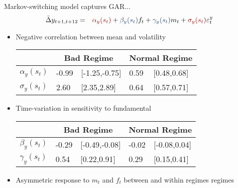 \documentclass[xcolor=dvipsnames, xcolor=table, 10pt]{beamer}
\newcommand{\pb}[1]{{\color{fedblue}#1}}
\newcommand{\rr}[1]{{\color{darkred}#1}}
\newcommand*{\h}{\hspace{0.15cm}}
\begin{document}
\begin{frame}{Markov-switching model captures GAR...}
\vspace*{-0.25in}
\begin{eqnarray*}
\bar{\Delta} {y}_{t+1,t+12} &=& \rr{\alpha_y (s_t)} + \pb{\beta_y (s_t)} f_t + \pb{\gamma_y (s_t)} m_t + \rr{\sigma_y (s_t)} \varepsilon^y_t
\end{eqnarray*}
\begin{itemize}
\item \rr{Negative correlation between mean and volatility}
\bigskip
\small
\begin{table}[ht!]
  \centering
  \vspace{-0.25cm}
  \begin{tabular}{p{1.5cm} p{1cm} p{2cm} p{1cm} p{2cm}}
\hline
& \multicolumn{2}{c}{\textbf{Bad Regime}} & \multicolumn{2}{c}{\textbf{Normal Regime}} \\
    \hline
  $\alpha_y(s_t)$   & -0.99 & [-1.25,-0.75] & \h0.59 & [\h0.48,\h0.68]  \\
  $\sigma_y(s_t)$   & \h2.60 & [\h2.35,\h2.89] & \h0.64 & [\h0.57,\h0.71]  \\
  \midrule
    \midrule
    \end{tabular}%
\end{table}%
\normalsize
\item \pb{Time-variation in sensitivity to fundamental}
\bigskip
\small
\begin{table}[ht!]
  \centering
  \vspace{-0.25cm}
  \begin{tabular}{p{1.5cm} p{1cm} p{2cm} p{1cm} p{2cm}}
\hline
& \multicolumn{2}{c}{\textbf{Bad Regime}} & \multicolumn{2}{c}{\textbf{Normal Regime}} \\
    \hline
  $\beta_y(s_t)$    & -0.29 & [-0.49,-0.08] & -0.02 & [-0.08,\h0.04]  \\
  $\gamma_y(s_t)$   & \h0.54 & [\h0.22,\h0.91] & \h0.29 & [\h0.15,\h0.41]  \\
  \midrule
    \midrule
    \end{tabular}%
\end{table}%
\end{itemize}

\normalsize
\begin{itemize}
     \item Asymmetric response to $m_t$ and $f_t$ between and within regimes regimes
\end{itemize}

\end{frame}
\end{document}
